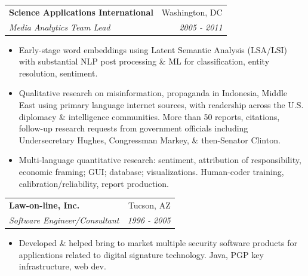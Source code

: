 \documentclass[letterpaper,11pt]{article}
\makeatletter
\newcommand{\resitem}[1]{\item #1 \vspace{-6pt}}
\newcommand{\ressubheading}[4]{\vspace{2pt}
\begin{tabular*}{7.58in}{l@{\extracolsep{\fill}}r}
		\textbf{#1} & #2 \\
		\textit{#3} & \textit{#4} \\
\end{tabular*}\vspace{-1pt}}
\makeatother
\begin{document}
\ressubheading{Science Applications International}{Washington, DC}{Media Analytics Team Lead}{2005 - 2011}
\begin{itemize}
\resitem{Early-stage word embeddings using Latent Semantic Analysis (LSA/LSI) with substantial NLP post processing \& ML for classification, entity resolution, sentiment.}
\resitem{Qualitative research on misinformation, propaganda in Indonesia, Middle East using primary language internet sources, with readership across the U.S. diplomacy \& intelligence communities. More than 50 reports, citations, follow-up research requests from government officials including Undersecretary Hughes, Congressman Markey, \& then-Senator Clinton.}
\resitem{Multi-language quantitative research: sentiment, attribution of responsibility, economic framing; GUI; database; visualizations.  Human-coder training, calibration/reliability, report production.}
\end{itemize} 



\ressubheading{Law-on-line, Inc.}{Tucson, AZ}{Software Engineer/Consultant}
{1996 - 2005}
\begin{itemize}
\resitem{Developed \& helped bring to market multiple security software products for 
applications related to digital signature technology. Java, PGP key infrastructure, web dev.}
\end{itemize}

\vspace{0.1in}
\end{document}
